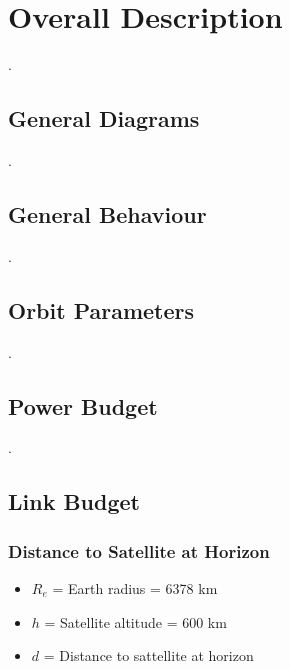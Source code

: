 %
%
%
%
%

%
%
%
%
%
%

\chapter{Overall Description} \label{ch:overall}

.

\section{General Diagrams}

.

\section{General Behaviour}

.

\section{Orbit Parameters}

.

\section{Power Budget}

.

\section{Link Budget}

\subsection{Distance to Satellite at Horizon}

\begin{itemize}
    \item $R_{e}$ = Earth radius = 6378 km
    \item $h$ = Satellite altitude = 600 km
    \item $d$ = Distance to sattellite at horizon
\end{itemize}

